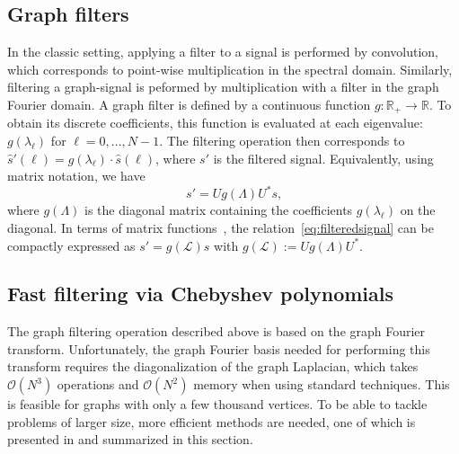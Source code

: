 \documentclass{article}
\newcommand{\Lap}{\mathcal{L}}
\newcommand{\Om}{\mathcal{O}}
\newcommand{\Rbb}{\mathbb{R}} \newcommand{\Cbb}{\mathbb{C}}
\begin{document}
\subsection{Graph filters}
In the classic setting, applying a filter to a signal is performed by convolution, which corresponds to point-wise multiplication in the spectral domain. 
Similarly, filtering a graph-signal is peformed by multiplication with a filter in the graph Fourier domain. A graph filter is defined by a continuous function $g: \Rbb_+ \rightarrow \Rbb$. To obtain its discrete coefficients, this function is evaluated at each eigenvalue: $g(\lambda_\ell)$ for $\ell  = 0,\ldots,N-1$. The filtering operation then corresponds to $\hat{s}'(\ell) =  g(\lambda_\ell) \cdot \hat{s}(\ell)$, where $s'$ is the filtered signal. Equivalently, using matrix notation, we have
\begin{equation} \label{eq:filteredsignal}
s' = U g(\Lambda) U^* s\text{,}
\end{equation}
where $g(\Lambda)$ is the diagonal matrix containing the coefficients $g(\lambda_\ell)$ on the diagonal. 
In terms of matrix functions~\cite{Higham2008}, the relation~\eqref{eq:filteredsignal} can be compactly expressed as
$s' = g(\Lap) s$ with $g(\Lap) := U g(\Lambda) U^{*}$.


\subsection{Fast filtering via Chebyshev polynomials} \label{sec:fastfiltering}

The graph filtering operation described above is based on the graph Fourier transform. Unfortunately, the graph Fourier basis needed for performing this transform requires the diagonalization of the graph Laplacian, which takes $\Om(N^3)$ operations and $\Om(N^2)$ memory when using standard techniques. This is feasible for graphs with only a few thousand vertices. To be able to tackle problems of larger size, more efficient methods are needed, one of which is presented in \cite{hammond2011wavelets}
and summarized in this section.
\end{document}
